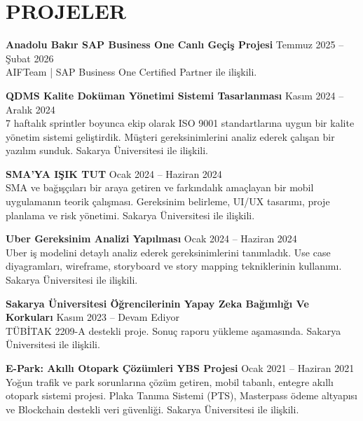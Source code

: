 \documentclass[a4paper,8pt]{article}
\begin{document}
\section{PROJELER}

\textbf{Anadolu Bakır SAP Business One Canlı Geçiş Projesi} \hfill {\small Temmuz 2025 -- Şubat 2026}\\
{\small AIFTeam | SAP Business One Certified Partner ile ilişkili.}

\vspace{3pt}

\textbf{QDMS Kalite Doküman Yönetimi Sistemi Tasarlanması} \hfill {\small Kasım 2024 -- Aralık 2024}\\
{\small 7 haftalık sprintler boyunca ekip olarak ISO 9001 standartlarına uygun bir kalite yönetim sistemi geliştirdik. Müşteri gereksinimlerini analiz ederek çalışan bir yazılım sunduk. Sakarya Üniversitesi ile ilişkili.}

\vspace{3pt}

\textbf{SMA'YA IŞIK TUT} \hfill {\small Ocak 2024 -- Haziran 2024}\\
{\small SMA ve bağışçıları bir araya getiren ve farkındalık amaçlayan bir mobil uygulamanın teorik çalışması. Gereksinim belirleme, UI/UX tasarımı, proje planlama ve risk yönetimi. Sakarya Üniversitesi ile ilişkili.}

\vspace{3pt}

\textbf{Uber Gereksinim Analizi Yapılması} \hfill {\small Ocak 2024 -- Haziran 2024}\\
{\small Uber iş modelini detaylı analiz ederek gereksinimlerini tanımladık. Use case diyagramları, wireframe, storyboard ve story mapping tekniklerinin kullanımı. Sakarya Üniversitesi ile ilişkili.}

\vspace{3pt}

\textbf{Sakarya Üniversitesi Öğrencilerinin Yapay Zeka Bağımlığı Ve Korkuları} \hfill {\small Kasım 2023 -- Devam Ediyor}\\
{\small TÜBİTAK 2209-A destekli proje. Sonuç raporu yükleme aşamasında. Sakarya Üniversitesi ile ilişkili.}

\vspace{3pt}

\textbf{E-Park: Akıllı Otopark Çözümleri YBS Projesi} \hfill {\small Ocak 2021 -- Haziran 2021}\\
{\small Yoğun trafik ve park sorunlarına çözüm getiren, mobil tabanlı, entegre akıllı otopark sistemi projesi. Plaka Tanıma Sistemi (PTS), Masterpass ödeme altyapısı ve Blockchain destekli veri güvenliği. Sakarya Üniversitesi ile ilişkili.}
\end{document}
